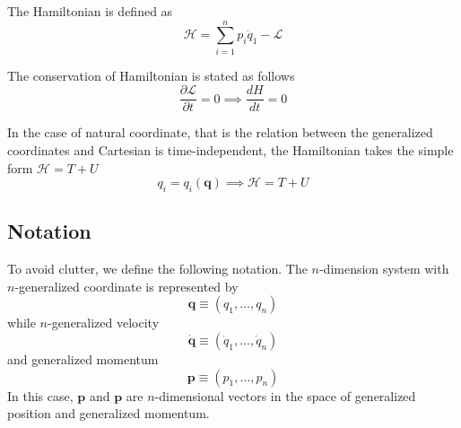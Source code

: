 \documentclass[../../../main.tex]{subfiles}
\begin{document}
The Hamiltonian is defined as 
\begin{equation*}
    \mathcal{H}=\sum_{i=1}^{n}p_i\dot{q}_1-\mathcal{L}
\end{equation*}

The conservation of Hamiltonian is stated as follows
\begin{equation*}
    \frac{\partial\mathcal{L}}{\partial t}=0\implies\frac{dH}{dt}=0
\end{equation*}

In the case of natural coordinate, that is the relation between the generalized coordinates and Cartesian is time-independent, the Hamiltonian takes the simple form $\mathcal{H}=T+U$
\begin{equation*}
    q_i=q_i(\mathbf{q})\implies\mathcal{H}=T+U
\end{equation*}

\subsection*{Notation}
To avoid clutter, we define the following notation.
The $n$-dimension system with $n$-generalized coordinate is represented by 
\begin{equation*}
    \mathbf{q}\equiv(q_1,\dots,q_n)
\end{equation*}
while $n$-generalized velocity
\begin{equation*}
    \dot{\mathbf{q}}\equiv(\dot{q}_1,\dots,\dot{q}_n)
\end{equation*}
and generalized momentum
\begin{equation*}
    \mathbf{p}\equiv(p_1,\dots,p_n)
\end{equation*}
In this case, $\mathbf{p}$ and $\mathbf{p}$ are $n$-dimensional vectors in the space of generalized position and generalized momentum.
\end{document}
